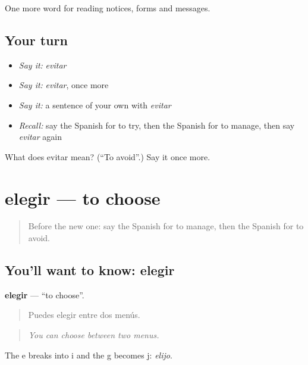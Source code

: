 \begin{grammarlens}[title={What you've built}]
One more word for reading notices, forms and messages.
\end{grammarlens}

\subsection*{Your turn}
\begin{itemize}
\raggedright
  \item \emph{Say it:} \emph{evitar}
  \item \emph{Say it:} \emph{evitar}, once more
  \item \emph{Say it:} a sentence of your own with \emph{evitar}
  \item \emph{Recall:} say the Spanish for to try, then the Spanish for to manage, then say \emph{evitar} again
\end{itemize}

\begin{tcolorbox}[breakable,colback=teal!4,colframe=teal!35!black,title={Before you move on}]
What does evitar mean? (\textquotedblleft{}To avoid\textquotedblright{}.) Say it once more.
\end{tcolorbox}
\section[elegir]{elegir — to choose}

\label{lesson:ES-C492-elegir}



\begin{quote}
Before the new one: say the Spanish for to manage, then the Spanish for to avoid.
\end{quote}

\subsection*{You'll want to know: elegir}
\textbf{elegir} — \textquotedblleft{}to choose\textquotedblright{}.

\begin{quote}
Puedes elegir entre dos menús.
\end{quote}

\begin{quote}
\emph{You can choose between two menus.}
\end{quote}

The e breaks into i and the g becomes j: \emph{elijo}.

